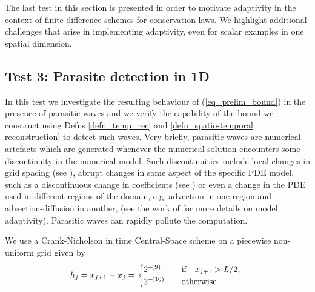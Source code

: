 \documentclass[final]{amsart}
\numberwithin{equation}{section}
\begin{document}
The last test in this section is presented in order to motivate adaptivity in the context of finite difference schemes for conservation laws. We highlight additional challenges that arise in implementing adaptivity, even for scalar examples in one spatial dimension.  
\subsection{Test 3: Parasite detection in 1D} \label{subsec:parasite}In this test we investigate the resulting behaviour of (\ref{eq_prelim_bound}) in the presence of parasitic waves and we verify the capability of the bound we construct using Defns \ref{defn_temp_rec} and \ref{defn_spatio-temporal reconstruction} to detect such waves. Very briefly, parasitic waves are numerical artefacts which are generated whenever the numerical solution encounters some discontinuity in the numerical model. Such discontinuities include local changes in grid spacing (see \cite{vichnevetsky1981propagation}),  abrupt changes in some aspect of the specific PDE model, such as a discontinuous change in coefficients (see \cite{trefethen1982group}) or even a change in the PDE used in different regions of the domain, e.g. advection in one region and advection-diffusion in another, (see the work of \cite{giesselmann2017posteriori} for more details on model adaptivity).    Parasitic waves can rapidly pollute the computation.

We use a Crank-Nicholson in time  Central-Space scheme  on a piecewise non-uniform grid given by
\begin{equation}\label{eq_grid_spacing_piecewise_nonu}
h_j=x_{j+1}-x_j= \begin{cases}
2^{-\!\left({9}\right)} \quad&\text{if}\quad x_{j+1}>L/2,\\
2^{-\!\left({10}\right)}\quad&\text{otherwise}
\end{cases}.
\end{equation}
\end{document}
